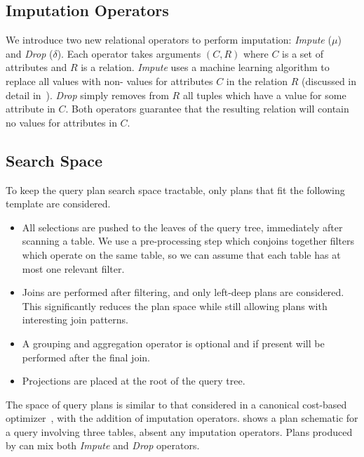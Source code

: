 \subsection{Imputation Operators}
\label{sec:operators}
We introduce two new relational operators to perform imputation: \textit{Impute} ($\mu$) and
\textit{Drop} ($\delta$). Each operator takes arguments $(C, R)$ where $C$ is a set of
attributes and $R$ is a relation. \textit{Impute} uses a machine learning algorithm to
replace all \nullv{} values with non-\nullv{} values for attributes $C$ in the relation $R$ (discussed in detail in~).
\textit{Drop} simply removes from $R$ all tuples which have a \nullv{} value for some attribute in $C$.
Both operators guarantee that the resulting relation will contain no \nullv{} values for
attributes in $C$.  

\subsection{Search Space}
\label{sec:search-space}
To keep the query plan search space tractable, only plans that fit the following template are considered.

\begin{itemize}
\item All selections are pushed to the leaves of the query tree, immediately after scanning a table. We use a pre-processing step which conjoins together filters which operate on the same table, so we can assume that each table has at most one relevant filter.

\item Joins are performed after filtering, and only left-deep plans are considered.
  This significantly reduces the plan space while still allowing plans with interesting join patterns.

\item A grouping and aggregation operator is optional and if present will be performed after the final join.

\item Projections are placed at the root of the query tree.
\end{itemize}
  
The space of query plans is similar to that considered in a canonical
cost-based optimizer~\cite{blasgen1981system}, with the addition of imputation operators.
 shows a plan schematic for a query involving three tables, absent any imputation operators. Plans produced by \ProjectName{} can mix both \textit{Impute} and \textit{Drop}
operators.

